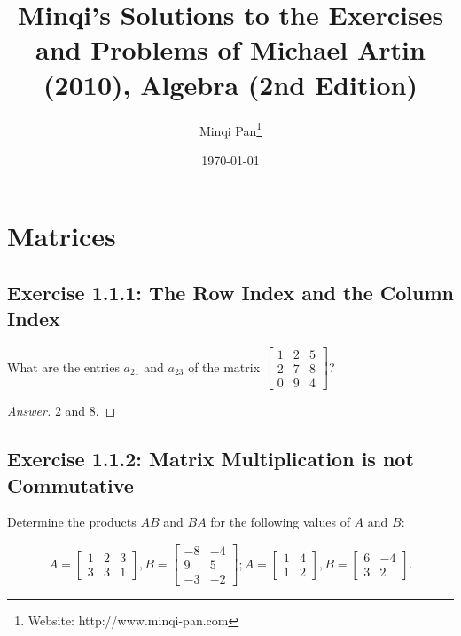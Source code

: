 \documentclass{amsbook}
\theoremstyle{definition}
\theoremstyle{remark}
\numberwithin{section}{chapter}
\numberwithin{equation}{chapter}
\begin{document}
\frontmatter

\title{Minqi's Solutions to the Exercises and Problems of Michael Artin (2010), Algebra (2nd Edition)}

\author{Minqi Pan\footnote{Website: http://www.minqi-pan.com}}

\date{\today}

\maketitle

\setcounter{page}{4}

\tableofcontents

\mainmatter

\chapter{Matrices}

\section{Exercise 1.1.1: The Row Index and the Column Index}

What are the entries $a_{21}$ and $a_{23}$ of the matrix $\begin{bmatrix}
1 & 2 & 5\\
2 & 7 & 8\\
0 & 9 & 4
\end{bmatrix}$?

\begin{proof}[Answer]
$2$ and $8$.
\end{proof}

\section{Exercise 1.1.2: Matrix Multiplication is not Commutative}

Determine the products $AB$ and $BA$ for the following values of $A$ and $B$:

\[ A=\begin{bmatrix}
1&2&3\\
3&3&1
\end{bmatrix}, B=\begin{bmatrix}
-8 & -4\\
9  & 5\\
-3 & -2\end{bmatrix}; A=\begin{bmatrix}
1&4\\
1&2\end{bmatrix}, B=\begin{bmatrix}
6 & -4\\
3 & 2\end{bmatrix}. \]
\end{document}
